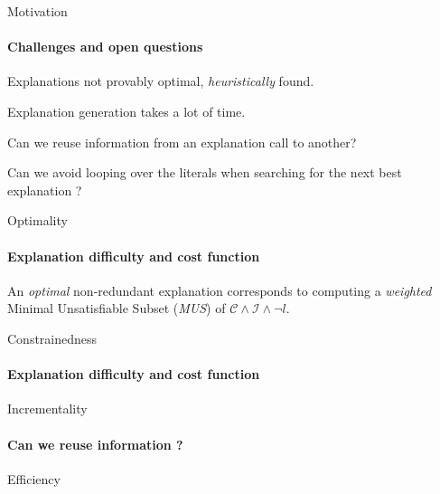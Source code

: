 \documentclass[handout]{beamer}
\newcommand\m[1]{\ensuremath{\mathcal{#1}}\xspace}
\begin{document}
	\begin{frame}{Motivation}
		\framesubtitle{Challenges and open questions}

		\begin{description}[font=\color{vuborange}\itshape]
			\item[Optimality] Explanations not provably optimal, \emph{heuristically} found. \pause
			\item[Efficiency] Explanation generation takes a lot of time. \pause
			\item[Incrementality] Can we reuse information from an explanation call to another? \pause
			\item[Constrainedness] Can we avoid looping over the literals when searching for the next best explanation ?
		\end{description}
	\end{frame}

	\begin{frame}{Optimality}
	\framesubtitle{Explanation difficulty and cost function}
	\begin{definition}
		An \emph{\color{vuborange}optimal} non-redundant explanation corresponds to computing a \emph{weighted} Minimal Unsatisfiable Subset (\emph{MUS}) of $\m{C} \wedge \m{I} \wedge \lnot l$.
	\end{definition}
	
	\end{frame}

	\begin{frame}{Constrainedness}
	\framesubtitle{Explanation difficulty and cost function}
	
	
	\end{frame}

	\begin{frame}{Incrementality}
	\framesubtitle{Can we reuse information ?}
	
	
	\end{frame}

	\begin{frame}{Efficiency}
	
	
	\end{frame}
\end{document}
